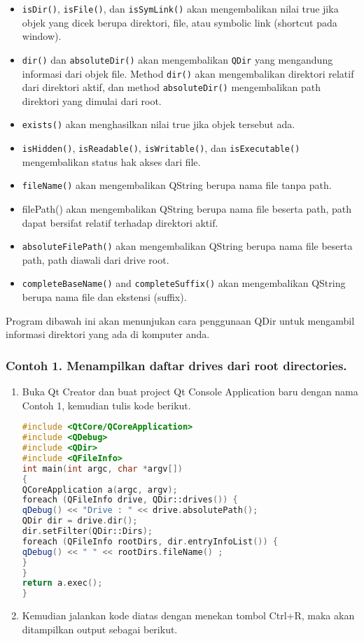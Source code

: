 \begin{itemize}
\tightlist
\item
  \texttt{isDir()}, \texttt{isFile()}, dan \texttt{isSymLink()} akan
  mengembalikan nilai true jika objek yang dicek berupa direktori, file,
  atau symbolic link (shortcut pada window).
\item
  \texttt{dir()} dan \texttt{absoluteDir()} akan mengembalikan
  \texttt{QDir} yang mengandung informasi dari objek file. Method
  \texttt{dir()} akan mengembalikan direktori relatif dari direktori
  aktif, dan method \texttt{absoluteDir()} mengembalikan path direktori
  yang dimulai dari root.
\item
  \texttt{exists()} akan menghasilkan nilai true jika objek tersebut
  ada.
\item
  \texttt{isHidden()}, \texttt{isReadable()}, \texttt{isWritable()}, dan
  \texttt{isExecutable()} mengembalikan status hak akses dari file.
\item
  \texttt{fileName()} akan mengembalikan QString berupa nama file tanpa
  path.
\item
  filePath() akan mengembalikan QString berupa nama file beserta path,
  path dapat bersifat relatif terhadap direktori aktif.
\item
  \texttt{absoluteFilePath()} akan mengembalikan QString berupa nama
  file beserta path, path diawali dari drive root.
\item
  \texttt{completeBaseName()} and \texttt{completeSuffix()} akan
  mengembalikan QString berupa nama file dan ekstensi (suffix).
\end{itemize}

Program dibawah ini akan menunjukan cara penggunaan QDir untuk mengambil
informasi direktori yang ada di komputer anda.

\subsubsection*{Contoh 1. Menampilkan daftar drives dari root directories.}

\begin{enumerate}
\def\labelenumi{\arabic{enumi}.}
\item
  Buka Qt Creator dan buat project Qt Console Application baru dengan
  nama Contoh 1, kemudian tulis kode berikut.

\begin{lstlisting}[language=c++]
#include <QtCore/QCoreApplication>
#include <QDebug>
#include <QDir>
#include <QFileInfo>
int main(int argc, char *argv[])
{
QCoreApplication a(argc, argv);
foreach (QFileInfo drive, QDir::drives()) {
qDebug() << "Drive : " << drive.absolutePath();
QDir dir = drive.dir();
dir.setFilter(QDir::Dirs);
foreach (QFileInfo rootDirs, dir.entryInfoList()) {
qDebug() << " " << rootDirs.fileName() ;
}
}
return a.exec();
}
\end{lstlisting}
\item
  Kemudian jalankan kode diatas dengan menekan tombol Ctrl+R, maka akan
  ditampilkan output sebagai berikut.
\end{enumerate}

